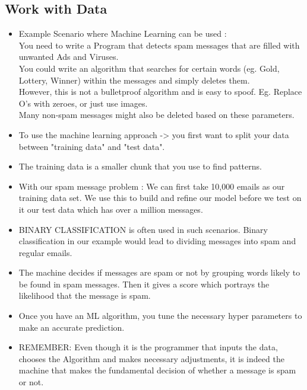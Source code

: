 \documentclass[11pt, oneside]{article}   	%
\begin{document}
\subsection{Work with Data}
\begin{itemize}
\item Example Scenario where Machine Learning can be used : \\
You need to write a Program that detects spam messages that are filled with unwanted Ads and Viruses.\\
You could write an algorithm that searches for certain words (eg. Gold, Lottery, Winner) within the messages and simply deletes them. \\
However, this is not a bulletproof algorithm and is easy to spoof. Eg. Replace O's with zeroes, or just use images.\\
Many non-spam messages might also be deleted based on these parameters. \\
\item To use the machine learning approach -> you first want to split your data between "training data" and "test data".
\item The training data is a smaller chunk that you use to find patterns.
\item With our spam message problem :
We can first take 10,000 emails as our training data set. We use this to build and refine our model before we test on it our test data which has over a million messages. \\
\item BINARY CLASSIFICATION is often used in such scenarios. Binary classification in our example would lead to dividing messages into spam and regular emails. 
\item The machine decides if messages are spam or not by grouping words likely to be found in spam messages. Then it gives a score which portrays the likelihood that the message is spam.
\item Once you have an ML algorithm, you tune the necessary hyper parameters to make an accurate prediction.
\item REMEMBER: Even though it is the programmer that inputs the data, chooses the Algorithm and makes necessary adjustments, it is indeed the machine that makes the fundamental decision of whether a message is spam or not.
\end{itemize}
\end{document}

